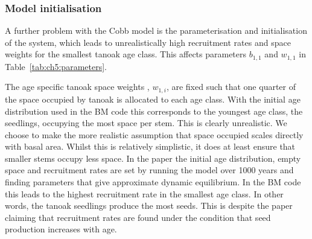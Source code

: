 \subsubsection{Model initialisation}

A further problem with the Cobb model is the parameterisation and initialisation of the system, which leads to unrealistically high recruitment rates and space weights for the smallest tanoak age class. This affects parameters $b_{1,1}$ and $w_{1,1}$ in Table~\ref{tab:ch5:parameters}.

The age specific tanoak space weights , $w_{1,i}$, are fixed such that one quarter of the space occupied by tanoak is allocated to each age class. With the initial age distribution used in the BM code this corresponds to the youngest age class, the seedlings, occupying the most space per stem. This is clearly unrealistic. We choose to make the more realistic assumption that space occupied scales directly with basal area. Whilst this is relatively simplistic, it does at least ensure that smaller stems occupy less space. In the paper the initial age distribution, empty space and recruitment rates are set by running the model over 1000 years and finding parameters that give approximate dynamic equilibrium. In the BM code this leads to the highest recruitment rate in the smallest age class. In other words, the tanoak seedlings produce the most seeds. This is despite the paper claiming that recruitment rates are found under the condition that seed production increases with age.

